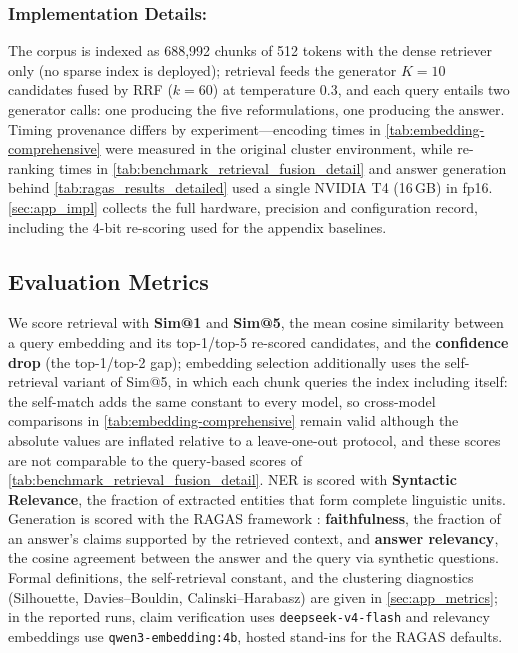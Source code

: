 \documentclass[11pt]{article}
\begin{document}
\subsubsection{Implementation Details:} The corpus is indexed as 688{,}992 chunks of 512 tokens with the dense retriever only (no sparse index is deployed); retrieval feeds the generator \(K=10\) candidates fused by RRF (\(k=60\)) at temperature 0.3, and each query entails two generator calls: one producing the five reformulations, one producing the answer. Timing provenance differs by experiment---encoding times in \cref{tab:embedding-comprehensive} were measured in the original cluster environment, while re-ranking times in \cref{tab:benchmark_retrieval_fusion_detail} and answer generation behind \cref{tab:ragas_results_detailed} used a single NVIDIA T4 (16\,GB) in fp16. \cref{sec:app_impl} collects the full hardware, precision and configuration record, including the 4-bit re-scoring used for the appendix baselines.

\subsection{Evaluation Metrics}
\label{subsec:metrics}

We score retrieval with \textbf{Sim@1} and \textbf{Sim@5}, the mean cosine similarity between a query embedding and its top-1/top-5 re-scored candidates, and the \textbf{confidence drop} (the top-1/top-2 gap); embedding selection additionally uses the self-retrieval variant of Sim@5, in which each chunk queries the index including itself: the self-match adds the same constant to every model, so cross-model comparisons in \cref{tab:embedding-comprehensive} remain valid although the absolute values are inflated relative to a leave-one-out protocol, and these scores are not comparable to the query-based scores of \cref{tab:benchmark_retrieval_fusion_detail}. NER is scored with \textbf{Syntactic Relevance}, the fraction of extracted entities that form complete linguistic units. Generation is scored with the RAGAS framework \citep{es2024ragas}: \textbf{faithfulness}, the fraction of an answer's claims supported by the retrieved context, and \textbf{answer relevancy}, the cosine agreement between the answer and the query via synthetic questions. Formal definitions, the self-retrieval constant, and the clustering diagnostics (Silhouette, Davies--Bouldin, Calinski--Harabasz) are given in \cref{sec:app_metrics}; in the reported runs, claim verification uses \texttt{deepseek-v4-flash} and relevancy embeddings use \texttt{qwen3-embedding:4b}, hosted stand-ins for the RAGAS defaults.
\end{document}
